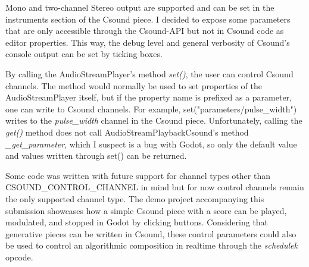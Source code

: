 \documentclass[12pt,a4paper]{article}
\begin{document}
Mono and two-channel Stereo output are supported and can be set in the instruments section of the Csound piece.
I decided to expose some parameters that are only accessible through the Csound-API but not in Csound code as editor properties.
This way, the debug level and general verbosity of Csound's console output can be set by ticking boxes.

By calling the AudioStreamPlayer's method \textit{set()}, the user can control Csound channels.
The method would normally be used to set properties of the \mbox{AudioStreamPlayer} itself, but if the property name is prefixed as a parameter, one can write to Csound channels.
For example, set("parameters/pulse\_width") writes to the \textit{pulse\_width} channel in the Csound piece.
Unfortunately, calling the \textit{get()} method does not call \mbox{AudioStreamPlaybackCsound's} method \textit{\_get\_parameter}, which I suspect is a bug with Godot, so only the default value and values written through set() can be returned.

Some code was written with future support for channel types other than \newline CSOUND\_CONTROL\_CHANNEL in mind but for now control channels remain the only supported channel type.
The demo project accompanying this submission showcases how a simple Csound piece with a score can be played, modulated, and stopped in Godot by clicking buttons.
Considering that generative pieces can be written in Csound, these control parameters could also be used to control an algorithmic composition in realtime through the \textit{schedulek} opcode.
\end{document}
